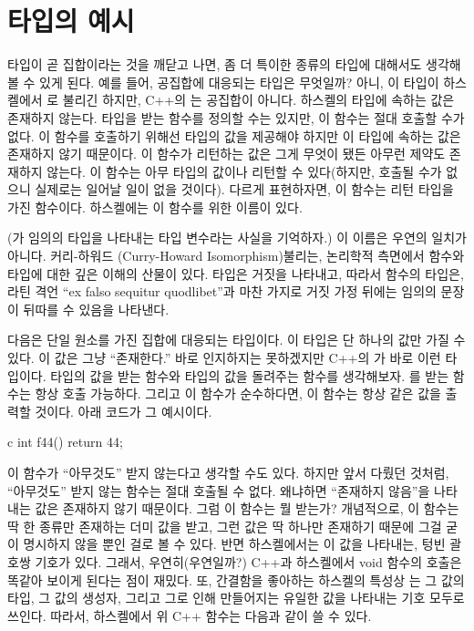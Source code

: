 \section{타입의 예시}

타입이 곧 집합이라는 것을 깨닫고 나면, 좀 더 특이한 종류의 타입에 대해서도 생각해 볼 수 있게 된다.
예를 들어, 공집합에 대응되는 타입은 무엇일까? 아니, 이 타입이 하스켈에서 로 불리긴 하지만, C++의 는 공집합이 아니다. 
하스켈의  타입에 속하는 값은 존재하지 않는다.  타입을 받는 함수를 정의할 수는 있지만, 이 함수는 절대 호출할 수가 없다.
이 함수를 호출하기 위해선  타입의 값을 제공해야 하지만 이 타입에 속하는 값은 존재하지 않기 때문이다. 
이 함수가 리턴하는 값은 그게 무엇이 됐든 아무런 제약도 존재하지 않는다. 이 함수는 아무 타입의 값이나 리턴할 수 있다(하지만, 호출될 수가 없으니 실제로는 일어날 일이 없을 것이다).
다르게 표현하자면, 이 함수는 \trPolymorphic 리턴 타입을 가진 함수이다. 하스켈에는 이 함수를 위한 이름이 있다.


(가 임의의 타입을 나타내는 타입 변수라는 사실을 기억하자.)
이 이름은 우연의 일치가 아니다. 커리-하워드 \trIsomorphism(Curry-Howard Isomorphism) 불리는, 논리학적 측면에서 함수와 타입에 대한 깊은 이해의 산물이 있다.
 타입은 거짓을 나타내고, 따라서  함수의 타입은, 라틴 격언 ``ex falso sequitur quodlibet''과 마찬 가지로 거짓 가정 뒤에는 임의의 문장이 뒤따를 수 있음을 나타낸다.

다음은 단일 원소를 가진 집합에 대응되는 타입이다. 이 타입은 단 하나의 값만 가질 수 있다. 이 값은 그냥 ``존재한다.''
바로 인지하지는 못하겠지만 C++의 가 바로 이런 타입이다.  타입의 값을 받는 함수와  타입의 값을 돌려주는 함수를 생각해보자.
를 받는 함수는 항상 호출 가능하다. 그리고 이 함수가 순수하다면, 이 함수는 항상 같은 값을 출력할 것이다. 아래 코드가 그 예시이다.

\begin{snip}{c}
int f44() { return 44; }
\end{snip}
이 함수가 ``아무것도'' 받지 않는다고 생각할 수도 있다. 하지만 앞서 다뤘던 것처럼, ``아무것도'' 받지 않는 함수는 절대 호출될 수 없다.
왜냐하면 ``존재하지 않음''을 나타내는 값은 존재하지 않기 때문이다. 그럼 이 함수는 뭘 받는가?
개념적으로, 이 함수는 딱 한 종류만 존재하는 더미 값을 받고, 그런 값은 딱 하나만 존재하기 때문에 그걸 굳이 명시하지 않을 뿐인 걸로 볼 수 있다.
반면 하스켈에서는 이 값을 나타내는, 텅빈 괄호쌍 \code{()} 기호가 있다.
그래서, 우연히(우연일까?) C++과 하스켈에서 void 함수의 호출은 똑같아 보이게 된다는 점이 재밌다.
또, 간결함을 좋아하는 하스켈의 특성상 \code{()}는 그 값의 타입, 그 값의 생성자, 그리고 그로 인해 만들어지는 유일한 값을 나타내는 기호 모두로 쓰인다.
따라서, 하스켈에서 위 C++ 함수는 다음과 같이 쓸 수 있다.


